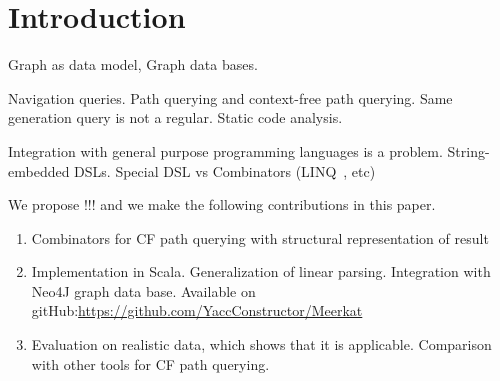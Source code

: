 \section{Introduction}

Graph as data model, Graph data bases.

Navigation queries.
Path querying and context-free path querying.
Same generation query is not a regular.
Static code analysis.

Integration with general purpose programming languages is a problem.
String-embedded DSLs.
Special DSL vs Combinators (LINQ~\cite{LINQ1, LINQ2}, etc)~\cite{ScalaGraphParsing}

We propose !!! and we make the following contributions in this paper.
\begin{enumerate}
\item Combinators for CF path querying with structural representation of result
\item Implementation in Scala. Generalization of linear parsing. Integration with Neo4J graph data base. Available on gitHub:\url{https://github.com/YaccConstructor/Meerkat}
\item Evaluation on realistic data, which shows that it is applicable. Comparison  with other tools 
for CF path querying.
\end{enumerate}